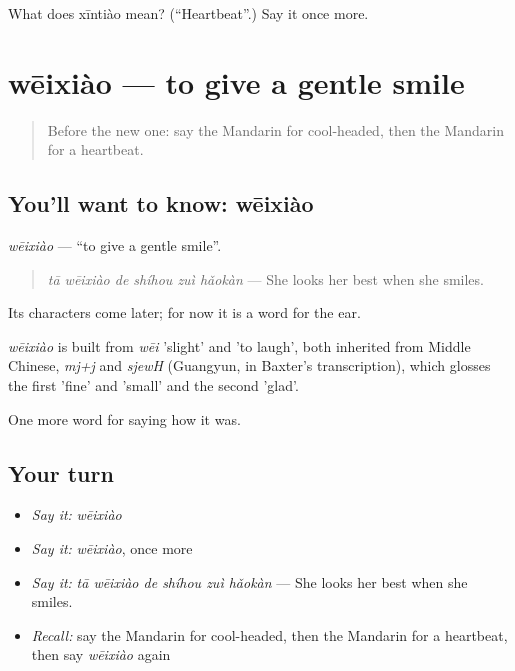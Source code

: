 \begin{tcolorbox}[breakable,colback=teal!4,colframe=teal!35!black,title={Before you move on}]
What does xīntiào mean? (\textquotedblleft{}Heartbeat\textquotedblright{}.) Say it once more.
\end{tcolorbox}
\section[wēixiào]{wēixiào — to give a gentle smile}

\label{lesson:ZH-C466-weixiao}



\begin{quote}
Before the new one: say the Mandarin for cool-headed, then the Mandarin for a heartbeat.
\end{quote}

\subsection*{You'll want to know: wēixiào}
\emph{wēixiào} — \textquotedblleft{}to give a gentle smile\textquotedblright{}.

\begin{quote}
\emph{tā wēixiào de shíhou zuì hǎokàn} — She looks her best when she smiles.
\end{quote}

Its characters come later; for now it is a word for the ear.

\begin{cousinweb}
\emph{wēixiào} is built from \emph{wēi} 'slight' and  'to laugh', both inherited from Middle Chinese, \emph{mj+j} and \emph{sjewH} (Guangyun, in Baxter's transcription), which glosses the first 'fine' and 'small' and the second 'glad'.
\end{cousinweb}

\begin{grammarlens}[title={What you've built}]
One more word for saying how it was.
\end{grammarlens}

\subsection*{Your turn}
\begin{itemize}
\raggedright
  \item \emph{Say it:} \emph{wēixiào}
  \item \emph{Say it:} \emph{wēixiào}, once more
  \item \emph{Say it:} \emph{tā wēixiào de shíhou zuì hǎokàn} — She looks her best when she smiles.
  \item \emph{Recall:} say the Mandarin for cool-headed, then the Mandarin for a heartbeat, then say \emph{wēixiào} again
\end{itemize}

